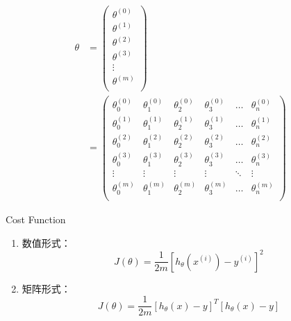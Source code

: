 \begin{equation} \begin{aligned}
	\theta & = \left(\begin{matrix}
			\theta^{(0)} \\ \theta^{(1)} \\ \theta^{(2)} \\ \theta^{(3)} \\ \vdots \\ \theta^{(m)} \\
		\end{matrix}\right) \\
	& = \left(\begin{matrix}
			\theta_0^{(0)} & \theta_1^{(0)} & \theta_2^{(0)} & \theta_3^{(0)} & \dots & \theta_n^{(0)} \\
			\theta_0^{(1)} & \theta_1^{(1)} & \theta_2^{(1)} & \theta_3^{(1)} & \dots & \theta_n^{(1)} \\
			\theta_0^{(2)} & \theta_1^{(2)} & \theta_2^{(2)} & \theta_3^{(2)} & \dots & \theta_n^{(2)} \\
			\theta_0^{(3)} & \theta_1^{(3)} & \theta_2^{(3)} & \theta_3^{(3)} & \dots & \theta_n^{(3)} \\
			\vdots    & \vdots    & \vdots    & \vdots    & \ddots & \vdots   \\
			\theta_0^{(m)} & \theta_1^{(m)} & \theta_2^{(m)} & \theta_3^{(m)} & \dots & \theta_n^{(m)} \\
			\end{matrix}\right)
\end{aligned}\end{equation}

Cost Function
\begin{enumerate}
\item 数值形式：
\begin{equation}
	J(\theta) = \frac{1}{2m} [ h_\theta(x^{(i)}) - y^{(i)}]^2
\end{equation}

\item 矩阵形式：
\begin{equation}
	J(\theta) = \frac{1}{2m} [h_\theta(x) - y]^T [ h_\theta(x) - y]
\end{equation}
\end{enumerate}

